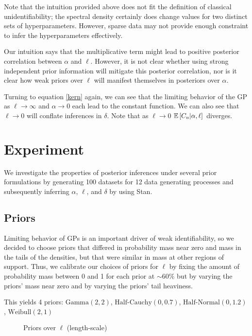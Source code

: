 \documentclass{article}
\newcommand{\Exp}[1]{\ensuremath{\mathbb{E} \lb #1 \rb}}
\newcommand{\lb}{\ensuremath{\left[}}
\newcommand{\rb}{\ensuremath{\right]}}
\begin{document}
Note that the intuition provided above does not fit the definition of 
classical unidentifiability; the spectral density certainly does change
values for two distinct sets of hyperparameters. However, sparse data
may not provide enough constraint to infer the hyperparameters effectively.

Our intuition says that the multiplicative term might lead to positive
posterior correlation between $\alpha$ and $\ell$. However, it is not clear
whether using strong independent prior information will mitigate this posterior
correlation, nor is it clear how weak priors over $\ell$ will manifest
themselves in posteriors over $\alpha$. 

Turning to equation \ref{kern} again, we can see that the limiting behavior of
the GP as $\ell \rightarrow \infty$ and $\alpha \rightarrow 0$ each lead to the
constant function. We can also see that $\ell \rightarrow 0$ will conflate
inferences in $\delta$.  Note that as $\ell \rightarrow 0$ $\Exp{C_u | \alpha,
\ell}$ diverges.

\section{Experiment} \label{experiment}

We investigate the properties of posterior inferences under several prior
formulations by generating 100 datasets for 12 data generating processes and
subsequently inferring $\alpha$, $\ell$, and $\delta$ by using Stan.

\subsection{Priors}

Limiting behavior of GPs is an important driver of weak identifiability, so we
decided to choose priors that differed in probability mass near zero and mass
in the tails of the densities, but that were similar in mass at other regions
of support. Thus, we calibrate our choices of priors for $\ell$ by fixing the
amount of probability mass between 0 and 1 for each prior at $\sim60\%$ but by
varying the priors' mass near zero and by varying the priors' tail heaviness.

This yields 4 priors: $\text{Gamma}(2, 2)$, $\text{Half-Cauchy}(0, 0.7)$,
$\text{Half-Normal}(0, 1.2)$, $\text{Weibull}(2, 1)$

\begin{figure}[t] 
  \caption{Priors over $\ell$ (length-scale)} \label{prior_plot}
\end{figure}
\end{document}
